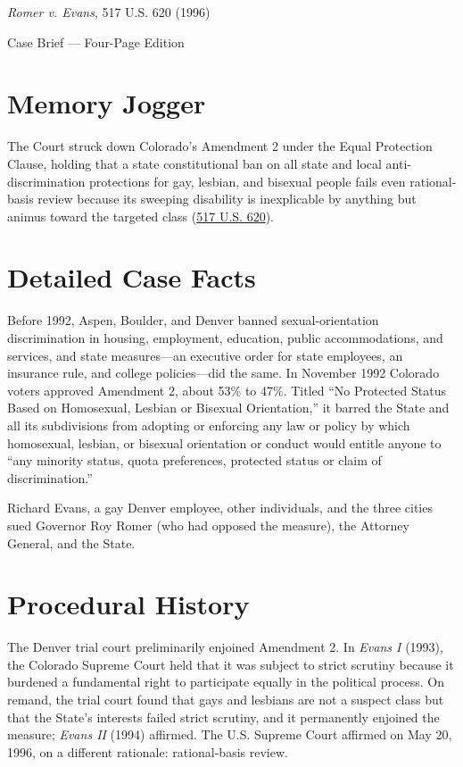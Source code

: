 \documentclass[12pt]{article}
\begin{document}
\begin{center}
{\LARGE \textit{Romer v. Evans}, 517 U.S. 620 (1996)\par}
\vspace{0.8em}
{\large Case Brief --- Four-Page Edition\par}
\end{center}
\vspace{1em}

\section{Memory Jogger}

The Court struck down Colorado's Amendment 2 under the Equal Protection Clause, holding that a state constitutional ban on all state and local anti-discrimination protections for gay, lesbian, and bisexual people fails even rational-basis review because its sweeping disability is inexplicable by anything but animus toward the targeted class (\href{https://www.courtlistener.com/opinion/118027/romer-v-evans/}{517 U.S. 620}).

\section{Detailed Case Facts}

Before 1992, Aspen, Boulder, and Denver banned sexual-orientation discrimination in housing, employment, education, public accommodations, and services, and state measures---an executive order for state employees, an insurance rule, and college policies---did the same. In November 1992 Colorado voters approved Amendment 2, about 53\% to 47\%. Titled ``No Protected Status Based on Homosexual, Lesbian or Bisexual Orientation,'' it barred the State and all its subdivisions from adopting or enforcing any law or policy by which homosexual, lesbian, or bisexual orientation or conduct would entitle anyone to ``any minority status, quota preferences, protected status or claim of discrimination.''

Richard Evans, a gay Denver employee, other individuals, and the three cities sued Governor Roy Romer (who had opposed the measure), the Attorney General, and the State.

\section{Procedural History}

The Denver trial court preliminarily enjoined Amendment 2. In \textit{Evans I} (1993), the Colorado Supreme Court held that it was subject to strict scrutiny because it burdened a fundamental right to participate equally in the political process. On remand, the trial court found that gays and lesbians are not a suspect class but that the State's interests failed strict scrutiny, and it permanently enjoined the measure; \textit{Evans II} (1994) affirmed. The U.S. Supreme Court affirmed on May 20, 1996, on a different rationale: rational-basis review.
\end{document}
